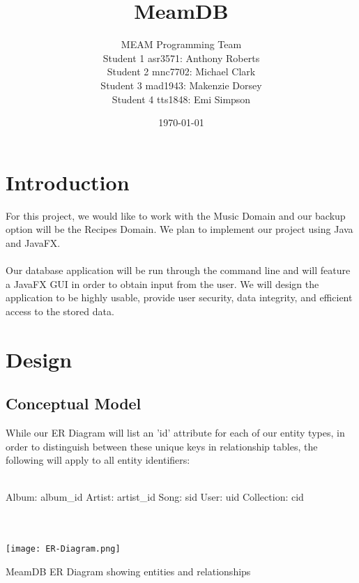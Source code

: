 \documentclass[12pt]{article}
\title{MeamDB}
\date{\today}
\author{MEAM Programming Team \\
Student 1 asr3571: Anthony Roberts\\
Student 2 mnc7702: Michael Clark\\
Student 3 mad1943: Makenzie Dorsey\\
Student 4 tts1848: Emi Simpson\\
}
\begin{document}
    \maketitle

    \section{Introduction}
    For this project, we would like to work with the Music Domain
    and our backup option will be the Recipes Domain. We plan to
    implement our project using Java and JavaFX.
    \\~\\
    \noindent Our database application will be run through the command line
    and will feature a JavaFX GUI in order to obtain input from the
    user. We will design the application to be highly usable, provide
    user security, data integrity, and efficient access to the stored data.

    \section{Design}
    \subsection{Conceptual Model}
    While our ER Diagram will list an 'id' attribute for each of our entity types,
    in order to distinguish between these unique keys in relationship tables, the
    following will apply to all entity identifiers:
    \\~\\
    \begin{tasks}
        \task Album: album\_id
        \task Artist: artist\_id
        \task Song: sid
        \task User: uid
        \task Collection: cid
    \end{tasks}
    \\~\\

    \texttt{[image: ER-Diagram.png]}
    \caption{MeamDB ER Diagram showing entities and relationships}
    \label{ER Diagram}
\end{document}
